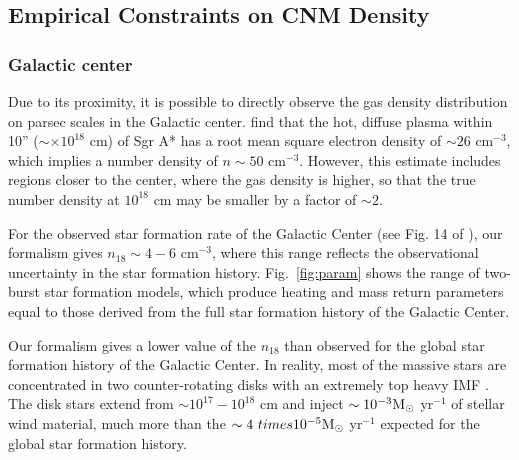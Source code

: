 \documentclass[usenatbib,fleqn]{mnras}
\newcommand{\Msun}{{\rm M_\odot}}
\begin{document}

\subsection{Empirical Constraints on CNM Density}
\label{sec:empirical}

\subsubsection{Galactic center} 
Due to its proximity, it is possible to directly observe the gas
density distribution on parsec scales in the Galactic
center. \citet{Baganoff+2003} find that the hot, diffuse plasma within
10'' ($\sim \times 10^{18}$ cm) of Sgr A* has a root mean square
electron density of $\sim 26$ cm$^{-3}$, which implies a number
density of $n\sim 50$ cm$^{-3}$. However, this estimate
includes regions closer to the center, where the gas density is
higher, so that the true number density at $10^{18}$ cm may be smaller
by a factor of $\sim 2$.

For the observed star formation rate of the Galactic Center (see
Fig. 14 of \citealt{Pfuhl+2011}), our formalism gives $n_{18}\sim 4-6$
cm$^{-3}$, where this range reflects the observational uncertainty in
the star formation history. Fig.~\ref{fig:param} shows the range
of two-burst star formation models, which produce heating and mass
return parameters equal to those derived from the full star formation
history of the Galactic Center. 

Our formalism gives a lower value of the $n_{18}$ than observed for
the global star formation history of the Galactic Center. In reality,
most of the massive stars are concentrated in two counter-rotating
disks \citep{Ghenzel+2003} with an extremely top heavy IMF
\citep{Bartko+2003}. The disk stars extend from $\sim 10^{17}-10^{18}$
cm and inject $\sim 10^{-3} \Msun$ yr$^{-1}$ of stellar wind
material, much more than the $\sim 4\ times 10^{-5} \Msun$ yr$^{-1}$
expected for the global star formation history. 
\end{document}
